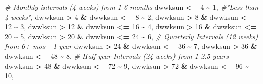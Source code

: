 \documentclass[
]{article}
\newenvironment{Shaded}{\begin{snugshade}}{\end{snugshade}}
\newcommand{\CommentTok}[1]{\textcolor[rgb]{0.56,0.35,0.01}{\textit{#1}}}
\newcommand{\DecValTok}[1]{\textcolor[rgb]{0.00,0.00,0.81}{#1}}
\newcommand{\NormalTok}[1]{#1}
\newcommand{\SpecialCharTok}[1]{\textcolor[rgb]{0.81,0.36,0.00}{\textbf{#1}}}
\begin{document}
\begin{Shaded}
\begin{Highlighting}[]
           \CommentTok{\# Monthly intervals (4 weeks) from 1{-}6 months}
\NormalTok{           dwwksun }\SpecialCharTok{\textless{}=} \DecValTok{4} \SpecialCharTok{\textasciitilde{}} \DecValTok{1}\NormalTok{, }\CommentTok{\#"Less than 4 weeks",}
\NormalTok{                                 dwwksun }\SpecialCharTok{\textgreater{}} \DecValTok{4} \SpecialCharTok{\&}\NormalTok{ dwwksun }\SpecialCharTok{\textless{}=} \DecValTok{8} \SpecialCharTok{\textasciitilde{}} \DecValTok{2}\NormalTok{,}
\NormalTok{                                 dwwksun }\SpecialCharTok{\textgreater{}} \DecValTok{8} \SpecialCharTok{\&}\NormalTok{ dwwksun }\SpecialCharTok{\textless{}=} \DecValTok{12} \SpecialCharTok{\textasciitilde{}} \DecValTok{3}\NormalTok{,}
\NormalTok{                                 dwwksun }\SpecialCharTok{\textgreater{}} \DecValTok{12} \SpecialCharTok{\&}\NormalTok{ dwwksun }\SpecialCharTok{\textless{}=} \DecValTok{16} \SpecialCharTok{\textasciitilde{}} \DecValTok{4}\NormalTok{, }
\NormalTok{                                 dwwksun }\SpecialCharTok{\textgreater{}} \DecValTok{16} \SpecialCharTok{\&}\NormalTok{ dwwksun }\SpecialCharTok{\textless{}=} \DecValTok{20} \SpecialCharTok{\textasciitilde{}} \DecValTok{5}\NormalTok{,}
\NormalTok{                                 dwwksun }\SpecialCharTok{\textgreater{}} \DecValTok{20} \SpecialCharTok{\&}\NormalTok{ dwwksun }\SpecialCharTok{\textless{}=} \DecValTok{24} \SpecialCharTok{\textasciitilde{}} \DecValTok{6}\NormalTok{,}
                                 \CommentTok{\# Quarterly Intervals (12 weeks) from 6+ mos {-} 1 year}
\NormalTok{                                 dwwksun }\SpecialCharTok{\textgreater{}} \DecValTok{24} \SpecialCharTok{\&}\NormalTok{ dwwksun }\SpecialCharTok{\textless{}=} \DecValTok{36} \SpecialCharTok{\textasciitilde{}} \DecValTok{7}\NormalTok{,}
\NormalTok{                                 dwwksun }\SpecialCharTok{\textgreater{}} \DecValTok{36} \SpecialCharTok{\&}\NormalTok{ dwwksun }\SpecialCharTok{\textless{}=} \DecValTok{48} \SpecialCharTok{\textasciitilde{}} \DecValTok{8}\NormalTok{, }
                                 \CommentTok{\# Half{-}year Intervals (24 weeks) from 1{-}2.5 years}
\NormalTok{                                 dwwksun }\SpecialCharTok{\textgreater{}} \DecValTok{48} \SpecialCharTok{\&}\NormalTok{ dwwksun }\SpecialCharTok{\textless{}=} \DecValTok{72} \SpecialCharTok{\textasciitilde{}} \DecValTok{9}\NormalTok{, }
\NormalTok{                                 dwwksun }\SpecialCharTok{\textgreater{}} \DecValTok{72} \SpecialCharTok{\&}\NormalTok{ dwwksun }\SpecialCharTok{\textless{}=} \DecValTok{96} \SpecialCharTok{\textasciitilde{}} \DecValTok{10}\NormalTok{, }

\end{Highlighting}
\end{Shaded}
\end{document}

